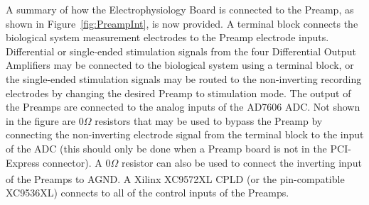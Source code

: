A summary of how the Electrophysiology Board is connected to the Preamp, as shown in Figure~\ref{fig:PreampInt}, is now provided. A terminal block connects the biological system measurement electrodes to the Preamp electrode inputs.  Differential or single-ended stimulation signals from the four Differential Output Amplifiers may be connected to the biological system using a terminal block, or the single-ended stimulation signals may be routed to the non-inverting recording electrodes by changing the desired Preamp to stimulation mode.  The output of the Preamps are connected to the analog inputs of the AD7606 ADC.  Not shown in the figure are $0\unit{\Omega}$ resistors that may be used to bypass the Preamp by connecting the non-inverting electrode signal from the terminal block to the input of the ADC (this should only be done when a Preamp board is not in the PCI-Express connector).  A $0\unit{\Omega}$ resistor can also be used to connect the inverting input of the Preamps to AGND.  A Xilinx\textsuperscript{\textregistered} XC9572XL CPLD (or the pin-compatible XC9536XL) connects to all of the control inputs of the Preamps.
